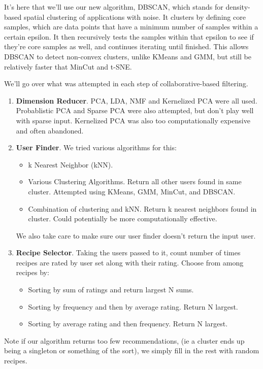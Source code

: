 \documentclass[11pt]{article}
\begin{document}
It's here that we'll use our new algorithm, DBSCAN, which stands for density-based spatial clustering of applications with noise. It clusters by defining core samples, which are data points that have a minimum number of samples within a certain epsilon. It then recursively tests the samples within that epsilon to see if they're core samples as well, and continues iterating until finished. This allows DBSCAN to detect non-convex clusters, unlike KMeans and GMM, but still be relatively faster that MinCut and t-SNE.

We'll go over what was attempted in each step of collaborative-based filtering.
\begin{enumerate}
    \item \textbf{Dimension Reducer}. PCA, LDA, NMF and Kernelized PCA were all used. Probablistic PCA and Sparse PCA were also attempted, but don't play well with sparse input. Kernelized PCA was also too computationally expensive and often abandoned.
    \item \textbf{User Finder}. We tried various algorithms for this:
    \begin{itemize}
        \item k Nearest Neighbor (kNN).
        \item Various Clustering Algorithms. Return all other users found in same cluster. Attempted using KMeans, GMM, MinCut, and DBSCAN.
        \item Combination of clustering and kNN. Return k nearest neighbors found in cluster. Could potentially be more computationally effective.
    \end{itemize}
    We also take care to make sure our user finder doesn't return the input user.
    \item \textbf{Recipe Selector}. Taking the users passed to it, count number of times recipes are rated by user set along with their rating. Choose from among recipes by:
    \begin{itemize}
        \item Sorting by sum of ratings and return largest N sums.
        \item Sorting by frequency and then by average rating. Return N largest.
        \item Sorting by average rating and then frequency. Return N largest.
    \end{itemize}
\end{enumerate}

Note if our algorithm returns too few recommendations, (ie a cluster ends up being a singleton or something of the sort), we simply fill in the rest with random recipes. 
\end{document}

